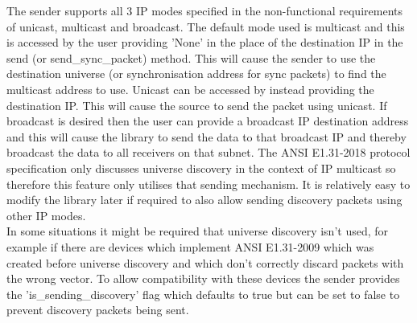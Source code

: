 \documentclass[11pt,a4paper]{article}
\begin{document}
The sender supports all 3 IP modes specified in the non-functional requirements of unicast, multicast and broadcast. The default mode used is multicast and this is accessed by the user providing 'None' in the place of the destination IP in the send (or send\_sync\_packet) method. This will cause the sender to use the destination universe (or synchronisation address for sync packets) to find the multicast address to use. Unicast can be accessed by instead providing the destination IP. This will cause the source to send the packet using unicast. If broadcast is desired then the user can provide a broadcast IP destination address and this will cause the library to send the data to that broadcast IP and thereby broadcast the data to all receivers on that subnet. The ANSI E1.31-2018 protocol specification \cite{ANSI_E1.31} only discusses universe discovery in the context of IP multicast so therefore this feature only utilises that sending mechanism.  It is relatively easy to modify the library later if required to also allow sending discovery packets using other IP modes. \\

In some situations it might be required that universe discovery isn't used, for example if there are devices which implement ANSI E1.31-2009 which was created before universe discovery and which don't correctly discard packets with the wrong vector. To allow compatibility with these devices the sender provides the 'is\_sending\_discovery' flag which defaults to true but can be set to false to prevent discovery packets being sent.
\end{document}

